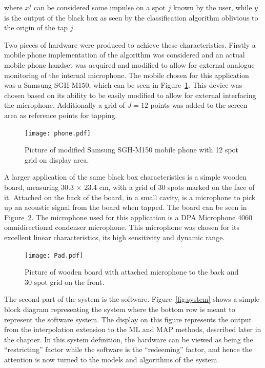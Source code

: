 where $x^j$ can be considered some impulse on a spot $j$ known by the user, while $y$ is the output of the black box as seen by the classification algorithm oblivious to the origin of the tap $j$.

Two pieces of hardware were produced to achieve these characteristics. Firstly a mobile phone implementation of the algorithm was considered and an actual mobile phone handset was acquired and modified to allow for external analogue monitoring of the internal microphone. The mobile chosen for this application was a Samsung SGH-M150, which can be seen in Figure~\ref{fig:phone}. This device was chosen based on its ability to be easily modified to allow for external interfacing the microphone. Additionally a grid of $J = 12$ points was added to the screen area as reference points for tapping.

\begin{figure}[!]
\centering
\texttt{[image: phone.pdf]}
\caption{Picture of modified Samsung SGH-M150 mobile phone with 12 spot grid on display area.}\label{fig:phone}
\end{figure}


A larger application of the same black box characteristics is a simple wooden board, measuring 30.3 $\times$ 23.4 cm, with a grid of 30 spots marked on the face of it. Attached on the back of the board, in a small cavity, is a microphone to pick up an acoustic signal from the board when tapped.  The board can be seen in Figure~\ref{fig:Pad}. The microphone used for this application is a DPA Microphone 4060 omnidirectional condenser microphone. This microphone was chosen for its excellent linear characteristics, its high sensitivity and dynamic range.

\begin{figure}[!]
\centering
\texttt{[image: Pad.pdf]}
\caption{Picture of wooden board with attached microphone to the back and 30 spot grid on the front.}\label{fig:Pad}
\end{figure}

The second part of the system is the software. Figure~\ref{fig:system} shows a simple block diagram representing the system where the bottom row is meant to represent the software system. The display on this figure represents the output from the interpolation extension to the ML and MAP methods, described later in the chapter. In this system definition, the hardware can be viewed as being the ``restricting'' factor while the software is the ``redeeming'' factor, and hence the attention is now turned to the models and algorithms of the system.


